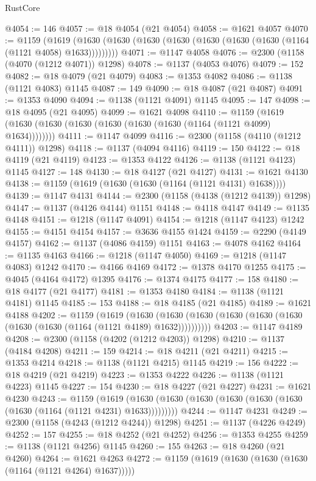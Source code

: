 \begin{lexlean}{RustCore}
\begin{coremodule}
@4054 := 146
@4057 := @18 @4054 (@21 @4054)
@4058 := @1621 @4057
@4070 := @1159
    (@1619 (@1630 (@1630 (@1630 (@1630 (@1630 (@1630 (@1630 (@1164 (@1121 @4058) @1633)))))))))
@4071 := @1147 @4058
@4076 := @2300 (@1158 (@4070 (@1212 @4071)) @1298)
@4078 := @1137 (@4053 @4076)
@4079 := 152
@4082 := @18 @4079 (@21 @4079)
@4083 := @1353 @4082
@4086 := @1138 (@1121 @4083) @1145
@4087 := 149
@4090 := @18 @4087 (@21 @4087)
@4091 := @1353 @4090
@4094 := @1138 (@1121 @4091) @1145
@4095 := 147
@4098 := @18 @4095 (@21 @4095)
@4099 := @1621 @4098
@4110 := @1159 (@1619 (@1630 (@1630 (@1630 (@1630 (@1630 (@1630 (@1164 (@1121 @4099) @1634))))))))
@4111 := @1147 @4099
@4116 := @2300 (@1158 (@4110 (@1212 @4111)) @1298)
@4118 := @1137 (@4094 @4116)
@4119 := 150
@4122 := @18 @4119 (@21 @4119)
@4123 := @1353 @4122
@4126 := @1138 (@1121 @4123) @1145
@4127 := 148
@4130 := @18 @4127 (@21 @4127)
@4131 := @1621 @4130
@4138 := @1159 (@1619 (@1630 (@1630 (@1164 (@1121 @4131) @1638))))
@4139 := @1147 @4131
@4144 := @2300 (@1158 (@4138 (@1212 @4139)) @1298)
@4147 := @1137 (@4126 @4144) @1151
@4148 := @4118 @4147
@4149 := @1135 @4148
@4151 := @1218 (@1147 @4091)
@4154 := @1218 (@1147 @4123) @1242
@4155 := @4151 @4154
@4157 := @3636 @4155 @1424
@4159 := @2290 (@4149 @4157)
@4162 := @1137 (@4086 @4159) @1151
@4163 := @4078 @4162
@4164 := @1135 @4163
@4166 := @1218 (@1147 @4050)
@4169 := @1218 (@1147 @4083) @1242
@4170 := @4166 @4169
@4172 := @1378 @4170 @1255
@4175 := @4045 (@4164 @4172) @1395
@4176 := @1374 @4175
@4177 := 158
@4180 := @18 @4177 (@21 @4177)
@4181 := @1353 @4180
@4184 := @1138 (@1121 @4181) @1145
@4185 := 153
@4188 := @18 @4185 (@21 @4185)
@4189 := @1621 @4188
@4202 := @1159
    (@1619
      (@1630 (@1630 (@1630 (@1630 (@1630 (@1630 (@1630 (@1630 (@1164 (@1121 @4189) @1632))))))))))
@4203 := @1147 @4189
@4208 := @2300 (@1158 (@4202 (@1212 @4203)) @1298)
@4210 := @1137 (@4184 @4208)
@4211 := 159
@4214 := @18 @4211 (@21 @4211)
@4215 := @1353 @4214
@4218 := @1138 (@1121 @4215) @1145
@4219 := 156
@4222 := @18 @4219 (@21 @4219)
@4223 := @1353 @4222
@4226 := @1138 (@1121 @4223) @1145
@4227 := 154
@4230 := @18 @4227 (@21 @4227)
@4231 := @1621 @4230
@4243 := @1159
    (@1619 (@1630 (@1630 (@1630 (@1630 (@1630 (@1630 (@1630 (@1164 (@1121 @4231) @1633)))))))))
@4244 := @1147 @4231
@4249 := @2300 (@1158 (@4243 (@1212 @4244)) @1298)
@4251 := @1137 (@4226 @4249)
@4252 := 157
@4255 := @18 @4252 (@21 @4252)
@4256 := @1353 @4255
@4259 := @1138 (@1121 @4256) @1145
@4260 := 155
@4263 := @18 @4260 (@21 @4260)
@4264 := @1621 @4263
@4272 := @1159 (@1619 (@1630 (@1630 (@1630 (@1164 (@1121 @4264) @1637)))))

\end{coremodule}
\end{lexlean}
